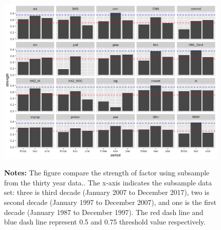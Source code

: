 \begin{landscape}
	\begin{figure}[ht]
		\includegraphics[scale = 0.75]{thirty_decompose_VI}
		\centering
		\begin{minipage}{\textwidth}
			{\footnotesize {\bf Notes:} The figure compare the strength of factor using subsample from the thirty year data.. The x-axis indicates the subsample data set: three is third decade (January 2007 to December 2017), two is second decade (January 1997 to December 2007), and one is the first decade (January 1987 to December 1997). The red dash line and blue dash line represent 0.5 and 0.75 threshold value respectively.}
		\end{minipage}
	\end{figure}
\end{landscape}



%
